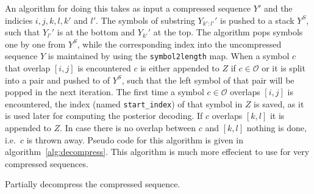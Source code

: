 An algorithm for doing this takes as input a compressed sequence $Y'$ and the
indicies $i, j, k, l, k'$ and $l'$. The symbols of substring $Y_{k':l'}'$ is
pushed to a stack $Y^S$, such that $Y_{l'}'$ is at the bottom and $Y_{k'}'$ at
the top. The algorithm pops symbols one by one from $Y^S$, while the
corresponding index into the uncompressed sequence $Y$ is maintained by using
the \texttt{symbol2length} map. When a symbol $c$ that overlap $[i, j]$ is
encountered $c$ is either appended to $Z$ if $c \in \mathcal{O}$ or it is split
into a pair and pushed to of $Y^S$, such that the left symbol of that pair will
be popped in the next iteration. The first time a symbol $c \in \mathcal{O}$
overlaps $[i, j]$ is encountered, the index (named \texttt{start\_index}) of
that symbol in $Z$ is saved, as it is used later for computing the posterior
decoding. If $c$ overlaps $[k, l]$ it is appended to $Z$. In case there is no
overlap between $c$ and $[k, l]$ nothing is done, i.e.\ $c$ is thrown away.
Pseudo code for this algorithm is given in algorithm~\ref{alg:decompress}. This
algorithm is much more effecient to use for very compressed sequences.

\begin{algorithm}
  \caption{Partially decompress the compressed sequence.}
  \label{alg:decompress}
  \begin{algorithmic}[1]
                 
                    \EndIf{}
                \Else{}
                     
                \EndIf{}
                 
            \EndIf{}
             
        \EndWhile{}
    \EndProcedure{}
  \end{algorithmic}
\end{algorithm}

